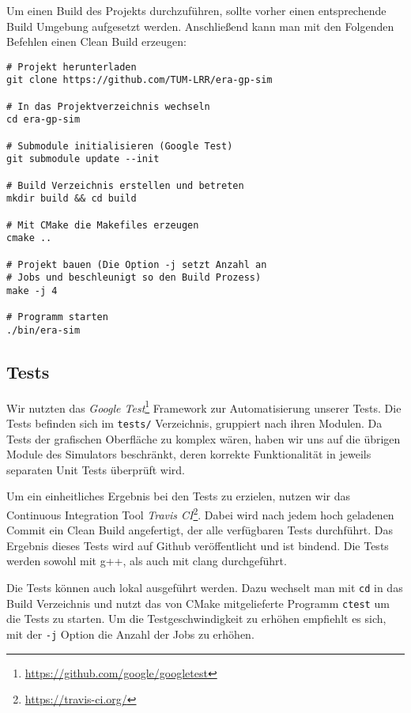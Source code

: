 Um einen Build des Projekts durchzuführen, sollte vorher einen entsprechende Build Umgebung
aufgesetzt werden. Anschließend kann man mit den Folgenden Befehlen einen Clean Build erzeugen:

\begin{lstlisting}
# Projekt herunterladen
git clone https://github.com/TUM-LRR/era-gp-sim

# In das Projektverzeichnis wechseln
cd era-gp-sim

# Submodule initialisieren (Google Test)
git submodule update --init

# Build Verzeichnis erstellen und betreten
mkdir build && cd build

# Mit CMake die Makefiles erzeugen
cmake ..

# Projekt bauen (Die Option -j setzt Anzahl an
# Jobs und beschleunigt so den Build Prozess)
make -j 4

# Programm starten
./bin/era-sim
\end{lstlisting}

\subsection{Tests}

Wir nutzten das \textit{Google Test}\footnote{\url{https://github.com/google/googletest}} Framework
zur Automatisierung unserer Tests. Die Tests befinden sich im \texttt{tests/} Verzeichnis, gruppiert
nach ihren Modulen. Da Tests der grafischen Oberfläche zu komplex wären, haben wir uns auf die übrigen
Module des Simulators beschränkt, deren korrekte Funktionalität in jeweils separaten Unit Tests
überprüft wird.

Um ein einheitliches Ergebnis bei den Tests zu erzielen, nutzen wir das Continuous Integration Tool
\textit{Travis CI}\footnote{\url{https://travis-ci.org/}}. Dabei wird nach jedem hoch geladenen
Commit ein Clean Build angefertigt, der alle verfügbaren Tests durchführt. Das Ergebnis dieses Tests
wird auf Github veröffentlicht und ist bindend. Die Tests werden sowohl mit g++, als auch mit clang
durchgeführt.

Die Tests können auch lokal ausgeführt werden. Dazu wechselt man mit \texttt{cd} in das Build
Verzeichnis und nutzt das von CMake mitgelieferte Programm \texttt{ctest} um die Tests zu starten.
Um die Testgeschwindigkeit zu erhöhen empfiehlt es sich, mit der \texttt{-j} Option die Anzahl
der Jobs zu erhöhen. 



